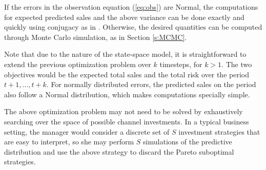If the errors in the observation equation (\ref{eq:obs}) are Normal, the computations for expected predicted sales and the above variance can be done exactly and quickly using conjugacy as in \cite[3.7.1]{zbMATH06123712}.
Otherwise, the desired quantities can be computed through Monte Carlo simulation, as in Section \ref{s:MCMC}.

Note that due to the nature of the state-space model, it is straightforward to extend the previous optimization problem over $k$ timesteps, for $k>1$.
The two objectives would be the expected total sales and the total risk over the period $t+1,\dots,t+k$.
For normally distributed errors, the predicted sales on the period also follow a Normal distribution, which makes computations specially simple.

The above optimization problem may not need to be solved by exhaustively searching over the space of possible channel investments. In a typical business setting, the manager would consider a discrete set of $S$ investment strategies that are easy to interpret, so she may perform $S$ simulations of the predictive distribution and use the above strategy to discard the Pareto suboptimal strategies.

